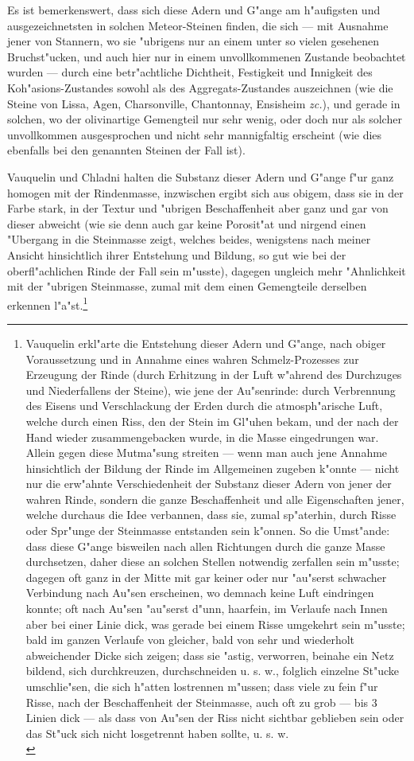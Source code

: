 \documentclass[a4paper, 11pt, oneside, german]{article}
\begin{document}
Es ist bemerkenswert, dass sich diese Adern und G"ange am h"aufigsten und ausgezeichnetsten in solchen Meteor-Steinen finden, die sich --- mit Ausnahme jener von Stannern, wo sie "ubrigens nur an einem unter so vielen gesehenen Bruchst"ucken, und auch hier nur in einem unvollkommenen Zustande beobachtet wurden --- durch eine betr"achtliche Dichtheit, Festigkeit und Innigkeit des Koh"asions-Zustandes sowohl als des Aggregats-Zustandes auszeichnen (wie die Steine von Lissa, Agen, Charsonville, Chantonnay, Ensisheim \emph{zc.}), und gerade in solchen, wo der olivinartige Gemengteil nur sehr wenig, oder doch nur als solcher unvollkommen ausgesprochen und nicht sehr mannigfaltig erscheint (wie dies ebenfalls bei den genannten Steinen der Fall ist).

Vauquelin und Chladni halten die Substanz dieser Adern und G"ange f"ur ganz homogen mit der Rindenmasse, inzwischen ergibt sich aus obigem, dass sie in der Farbe stark, in der Textur und "ubrigen Beschaffenheit aber ganz und gar von dieser abweicht (wie sie denn auch gar keine Porosit"at und nirgend einen "Ubergang in die Steinmasse zeigt, welches beides, wenigstens nach meiner Ansicht hinsichtlich ihrer Entstehung und Bildung, so gut wie bei der oberfl"achlichen Rinde der Fall sein m"usste), dagegen ungleich mehr "Ahnlichkeit mit der "ubrigen Steinmasse, zumal mit dem einen Gemengteile derselben erkennen l"a"st.\footnote{Vauquelin erkl"arte die Entstehung dieser Adern und G"ange, nach obiger Voraussetzung und in Annahme eines wahren Schmelz-Prozesses zur Erzeugung der Rinde (durch Erhitzung in der Luft w"ahrend des Durchzuges und Niederfallens der Steine), wie jene der Au"senrinde: durch Verbrennung des Eisens und Verschlackung der Erden durch die atmosph"arische Luft, welche durch einen Riss, den der Stein im Gl"uhen bekam, und der nach der Hand wieder zusammengebacken wurde, in die Masse eingedrungen war. Allein gegen diese Mutma"sung streiten --- wenn man auch jene Annahme hinsichtlich der Bildung der Rinde im Allgemeinen zugeben k"onnte --- nicht nur die erw"ahnte Verschiedenheit der Substanz dieser Adern von jener der wahren Rinde, sondern die ganze Beschaffenheit und alle Eigenschaften jener, welche durchaus die Idee verbannen, dass sie, zumal sp"aterhin, durch Risse oder Spr"unge der Steinmasse entstanden sein k"onnen. So die Umst"ande: dass diese G"ange bisweilen nach allen Richtungen durch die ganze Masse durchsetzen, daher diese an solchen Stellen notwendig zerfallen sein m"usste; dagegen oft ganz in der Mitte mit gar keiner oder nur "au"serst schwacher Verbindung nach Au"sen erscheinen, wo demnach keine Luft eindringen konnte; oft nach Au"sen "au"serst d"unn, haarfein, im Verlaufe nach Innen aber bei einer Linie dick, was gerade bei einem Risse umgekehrt sein m"usste; bald im ganzen Verlaufe von gleicher, bald von sehr und wiederholt abweichender Dicke sich zeigen; dass sie "astig, verworren, beinahe ein Netz bildend, sich durchkreuzen, durchschneiden u. s. w., folglich einzelne St"ucke umschlie"sen, die sich h"atten lostrennen m"ussen; dass viele zu fein f"ur Risse, nach der Beschaffenheit der Steinmasse, auch oft zu grob --- bis 3 Linien dick --- als dass von Au"sen der Riss nicht sichtbar geblieben sein oder das St"uck sich nicht losgetrennt haben sollte, u. s. w.\\
}
\end{document}
